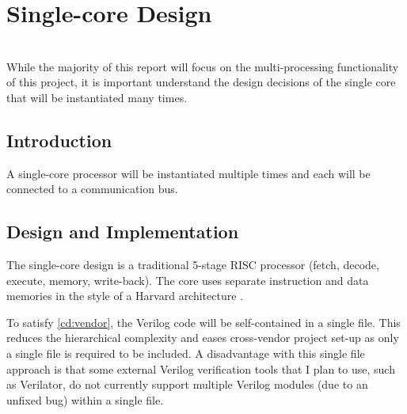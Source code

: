 
\chapter{Single-core Design}
\startcontents[chapters]
\noindent\\
While the majority of this report will focus on the multi-processing functionality of this project, it is important understand the design decisions of the single core that will be instantiated many times.

\section{Introduction}
A single-core processor will be instantiated multiple times and each will be connected to a communication bus.

\section{Design and Implementation}
The single-core design is a traditional 5-stage RISC processor (fetch, decode, execute, memory, write-back). The core uses separate instruction and data memories in the style of a Harvard architecture \cite{harvard}.

To satisfy \ref{cd:vendor}, the Verilog code will be self-contained in a single file. This reduces the hierarchical complexity and eases cross-vendor project set-up as only a single file is required to be included. 
A disadvantage with this single file approach is that some external Verilog verification tools that I plan to use, such as Verilator, do not currently support multiple Verilog modules (due to an unfixed bug) within a single file. 

